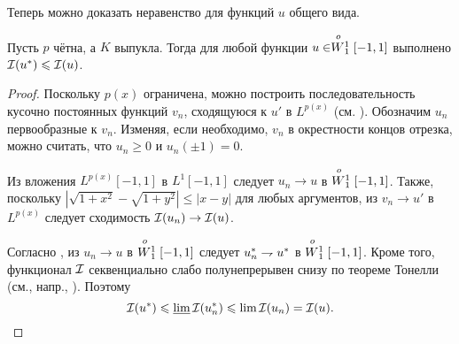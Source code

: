 Теперь можно доказать неравенство для функций $u$ общего вида.

\begin{thm}
\label{variable_exponent_thm}
Пусть $p$ чётна, а $K$ выпукла.
Тогда для любой функции $u \in \stackrel{o\ }{W{}_1^1}[-1, 1]$ выполнено $\mathcal{I}({u^*}) \leqslant \mathcal{I}(u)$.
\end{thm}

\begin{proof}
Поскольку $p(x)$ ограничена, можно построить последовательность кусочно постоянных функций $v_n$, сходящуюся к $u'$ в $L^{p(x)}$
(см. \cite[Теорема~1.4.1]{Sharapudinov}).
Обозначим $u_n$ первообразные к $v_n$.
Изменяя, если необходимо, $v_n$ в окрестности концов отрезка, можно считать, что $u_n \ge 0$ и $u_n(\pm 1) = 0$.

Из вложения $L^{p(x)}[-1, 1]$ в $L^1[-1, 1]$ следует $u_n \to u$ в $\stackrel{o\ }{W{}_1^1}[-1, 1]$.
Также, поскольку $| \sqrt{ 1 + x^2 } - \sqrt{ 1 + y^2 } | \le | x - y |$ для любых аргументов,
из $v_n \to u'$ в $L^{p(x)}$ следует сходимость $\mathcal{I}( u_n ) \to \mathcal{I}( u )$.

%

Согласно \cite[теорема 1]{Brock}, из $u_n \to u$ в $\stackrel{o\ }{W{}_1^1}[-1, 1]$ следует ${u_n^*} \rightharpoondown {u^*}$ в $\stackrel{o\ }{W{}_1^1}[-1, 1]$.
Кроме того, функционал $\mathcal{I}$ секвенциально слабо полунепрерывен снизу по теореме Тонелли (см., напр., \cite[Теорема 3.5]{BGH}).
Поэтому
$$
\mathcal{I}({u^*}) \leqslant \varliminf \mathcal{I}({u_n^*}) \leqslant \lim \mathcal{I}(u_n) = \mathcal{I}(u).
$$
\end{proof}

